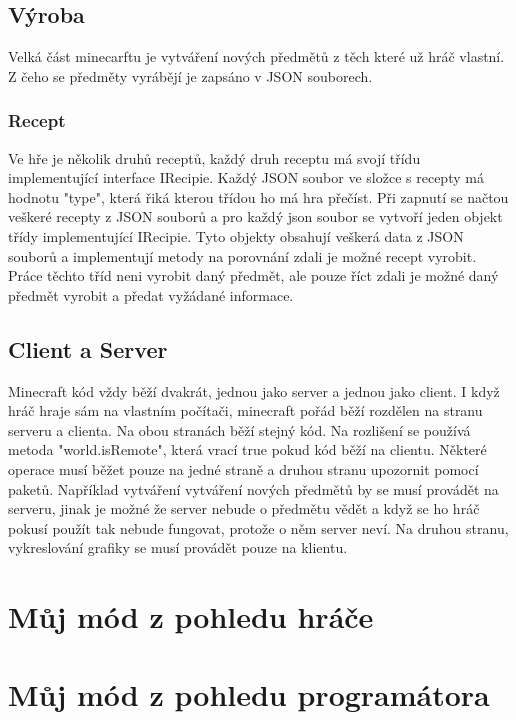 \documentclass[FM,RP]{tulthesis}
\begin{document}
\section{Výroba}
Velká část minecarftu je vytváření nových předmětů z těch které už hráč vlastní. Z čeho se předměty vyrábějí je zapsáno v JSON souborech. 
\subsection{Recept}
Ve hře je několik druhů receptů, každý druh receptu má svojí třídu implementující interface IRecipie. Každý JSON soubor ve složce s recepty má hodnotu "type", která řiká kterou třídou ho má hra přečíst. Při zapnutí se načtou veškeré recepty z JSON souborů a pro každý json soubor se vytvoří jeden objekt třídy implementující IRecipie. Tyto objekty obsahují veškerá data z JSON souborů a implementují metody na porovnání zdali je možné recept vyrobit. Práce těchto tříd neni vyrobit daný předmět, ale pouze říct zdali je možné daný předmět vyrobit a předat vyžádané informace.    
\section{Client a Server}
Minecraft kód vždy běží dvakrát, jednou jako server a jednou jako client. I když hráč hraje sám na vlastním počítači, minecraft pořád běží rozdělen na stranu serveru a clienta. Na obou stranách běží stejný kód. Na rozlišení se používá metoda "world.isRemote", která vrací true pokud kód běží na clientu. Některé operace musí běžet pouze na jedné straně a druhou stranu upozornit pomocí paketů. Například vytváření vytváření nových předmětů by se musí provádět na serveru, jinak je možné že server nebude o předmětu vědět a když se ho hráč pokusí použít tak nebude fungovat, protože o něm server neví. Na druhou stranu, vykreslování grafiky se musí provádět pouze na klientu. 
\chapter{Můj mód z pohledu hráče}

\chapter{Můj mód z pohledu programátora}
\end{document}
